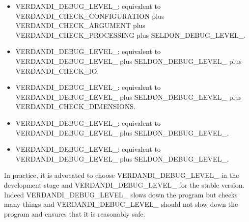 \documentclass{tufte-book}
\begin{document}
\begin{itemize}
\item \-V\-E\-R\-D\-A\-N\-D\-I\-\_\-\-D\-E\-B\-U\-G\-\_\-\-L\-E\-V\-E\-L\-\_\-: equivalent to \-V\-E\-R\-D\-A\-N\-D\-I\-\_\-\-C\-H\-E\-C\-K\-\_\-\-C\-O\-N\-F\-I\-G\-U\-R\-A\-T\-I\-O\-N plus \-V\-E\-R\-D\-A\-N\-D\-I\-\_\-\-C\-H\-E\-C\-K\-\_\-\-A\-R\-G\-U\-M\-E\-N\-T plus \-V\-E\-R\-D\-A\-N\-D\-I\-\_\-\-C\-H\-E\-C\-K\-\_\-\-P\-R\-O\-C\-E\-S\-S\-I\-N\-G plus \-S\-E\-L\-D\-O\-N\-\_\-\-D\-E\-B\-U\-G\-\_\-\-L\-E\-V\-E\-L\-\_.


\item \-V\-E\-R\-D\-A\-N\-D\-I\-\_\-\-D\-E\-B\-U\-G\-\_\-\-L\-E\-V\-E\-L\-\_\-: equivalent to \-V\-E\-R\-D\-A\-N\-D\-I\-\_\-\-D\-E\-B\-U\-G\-\_\-\-L\-E\-V\-E\-L\-\_ plus \-S\-E\-L\-D\-O\-N\-\_\-\-D\-E\-B\-U\-G\-\_\-\-L\-E\-V\-E\-L\-\_ plus \-V\-E\-R\-D\-A\-N\-D\-I\-\_\-\-C\-H\-E\-C\-K\-\_\-\-I\-O.


\item \-V\-E\-R\-D\-A\-N\-D\-I\-\_\-\-D\-E\-B\-U\-G\-\_\-\-L\-E\-V\-E\-L\-\_\-: equivalent to \-V\-E\-R\-D\-A\-N\-D\-I\-\_\-\-D\-E\-B\-U\-G\-\_\-\-L\-E\-V\-E\-L\-\_ plus \-S\-E\-L\-D\-O\-N\-\_\-\-D\-E\-B\-U\-G\-\_\-\-L\-E\-V\-E\-L\-\_ plus \-V\-E\-R\-D\-A\-N\-D\-I\-\_\-\-C\-H\-E\-C\-K\-\_\-\-D\-I\-M\-E\-N\-S\-I\-O\-N\-S.


\item \-V\-E\-R\-D\-A\-N\-D\-I\-\_\-\-D\-E\-B\-U\-G\-\_\-\-L\-E\-V\-E\-L\-\_\-: equivalent to \-V\-E\-R\-D\-A\-N\-D\-I\-\_\-\-D\-E\-B\-U\-G\-\_\-\-L\-E\-V\-E\-L\-\_ plus \-S\-E\-L\-D\-O\-N\-\_\-\-D\-E\-B\-U\-G\-\_\-\-L\-E\-V\-E\-L\-\_.


\item \-V\-E\-R\-D\-A\-N\-D\-I\-\_\-\-D\-E\-B\-U\-G\-\_\-\-L\-E\-V\-E\-L\-\_\-: equivalent to \-V\-E\-R\-D\-A\-N\-D\-I\-\_\-\-D\-E\-B\-U\-G\-\_\-\-L\-E\-V\-E\-L\-\_ plus \-S\-E\-L\-D\-O\-N\-\_\-\-D\-E\-B\-U\-G\-\_\-\-L\-E\-V\-E\-L\-\_.


\end{itemize}

\-In practice, it is advocated to choose \-V\-E\-R\-D\-A\-N\-D\-I\-\_\-\-D\-E\-B\-U\-G\-\_\-\-L\-E\-V\-E\-L\-\_ in the development stage and \-V\-E\-R\-D\-A\-N\-D\-I\-\_\-\-D\-E\-B\-U\-G\-\_\-\-L\-E\-V\-E\-L\-\_ for the stable version. \-Indeed \-V\-E\-R\-D\-A\-N\-D\-I\-\_\-\-D\-E\-B\-U\-G\-\_\-\-L\-E\-V\-E\-L\-\_ slows down the program but checks many things and \-V\-E\-R\-D\-A\-N\-D\-I\-\_\-\-D\-E\-B\-U\-G\-\_\-\-L\-E\-V\-E\-L\-\_ should not slow down the program and ensures that it is reasonably safe.
\end{document}

